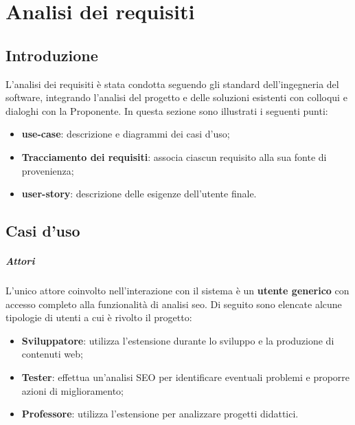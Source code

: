 \chapter{Analisi dei requisiti}
\label{cap:analisi-requisiti}


\section{Introduzione}

\par L'analisi dei \gls{requisiti} è stata condotta seguendo gli standard dell'ingegneria del software, integrando l'analisi del progetto e delle soluzioni esistenti con colloqui e dialoghi con la Proponente. In questa sezione sono illustrati i seguenti punti:
\begin{itemize}
    \item \textbf{\Gls{use-case}}: descrizione e diagrammi dei casi d'uso;
    \item \textbf{Tracciamento dei requisiti}: associa ciascun requisito alla sua fonte di provenienza;
    \item \textbf{\Gls{user-story}}: descrizione delle esigenze dell’utente finale.
\end{itemize}

\section{Casi d'uso}

\paragraph*{Attori}
\par L'unico attore coinvolto nell'interazione con il sistema è un \textbf{utente generico} con accesso completo alla funzionalità di analisi \gls{seo}. Di seguito sono elencate alcune tipologie di utenti a cui è rivolto il progetto:
\begin{itemize}
    \item \textbf{Sviluppatore}: utilizza l'estensione durante lo sviluppo e la produzione di contenuti web;
    \item \textbf{Tester}: effettua un'analisi SEO per identificare eventuali problemi e proporre azioni di miglioramento;
    \item \textbf{Professore}: utilizza l'estensione per analizzare progetti didattici.
\end{itemize}

